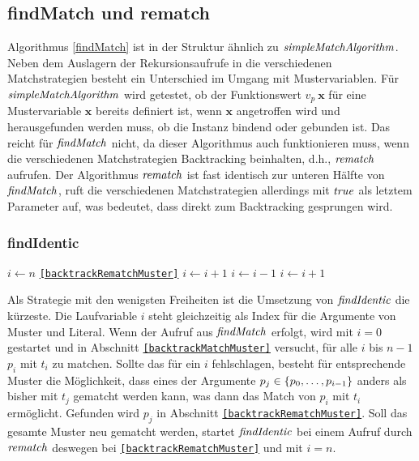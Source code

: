 \subsection{findMatch und rematch}
Algorithmus \ref{findMatch} ist in der Struktur ähnlich zu $\mathit{simpleMatchAlgorithm}$. Neben dem Auslagern der Rekursionsaufrufe in die verschiedenen Matchstrategien besteht ein Unterschied im Umgang mit Mustervariablen. Für $\mathit{simpleMatchAlgorithm}$ wird getestet, ob der Funktionswert $v_p~\mathbf x$ für eine Mustervariable $\mathbf x$ bereits definiert ist, wenn $\mathbf x$ angetroffen wird und herausgefunden werden muss, ob die Instanz bindend oder gebunden ist. Das reicht für $\mathit{findMatch}$ nicht, da dieser Algorithmus auch funktionieren muss, wenn die verschiedenen Matchstrategien Backtracking beinhalten, d.h., $\mathit{rematch}$ aufrufen.
Der Algorithmus $\mathit{rematch}$ ist fast identisch zur unteren Hälfte von $\mathit{findMatch}$, ruft die verschiedenen Matchstrategien allerdings mit $\mathit{true}$ als letztem Parameter auf, was bedeutet, dass direkt zum Backtracking gesprungen wird.



\subsubsection {findIdentic}
\begin{algorithm}
\DontPrintSemicolon
\caption{$\Const{findIdentic} \colon M \times T \times \mathit{Bool} \rightarrow \mathit{Bool}$}\label{findIdentic}
\;
 {
	$i \leftarrow n$\;
	\Goto \texttt{\ref{backtrackRematchMuster}}\;
}
\Loop {} {
	 \label{backtrackMatchMuster}
	 {
		$i \leftarrow i + 1$\;
		 {}    
	}
	 \label{backtrackRematchMuster}
	 { 
		 {}
		$i \leftarrow i - 1$\;
	}    
	$i \leftarrow i + 1$\;
}
\end{algorithm}


Als Strategie mit den wenigsten Freiheiten ist die Umsetzung von $\mathit{findIdentic}$ die kürzeste. Die Laufvariable $i$ steht gleichzeitig als Index für die Argumente von Muster und Literal. Wenn der Aufruf aus $\mathit{findMatch}$ erfolgt, wird mit $i = 0$ gestartet und in Abschnitt \texttt{\ref{backtrackMatchMuster}} versucht, für alle $i$ bis $n-1$ $p_i$ mit $t_i$ zu matchen. Sollte das  für ein $i$ fehlschlagen, besteht für entsprechende Muster die Möglichkeit, dass eines der Argumente $p_j \in \{{p}_{0}, \dots, {p}_{i-1}\}$ anders als bisher mit $t_j$ gematcht werden kann, was dann das Match von $p_i$ mit $t_i$ ermöglicht. Gefunden wird $p_j$ in Abschnitt \texttt{\ref{backtrackRematchMuster}}. 
Soll das gesamte Muster neu gematcht werden, startet $\mathit{findIdentic}$ bei einem Aufruf durch $\mathit{rematch}$ deswegen bei \texttt{\ref{backtrackRematchMuster}} und mit $i = n$.


